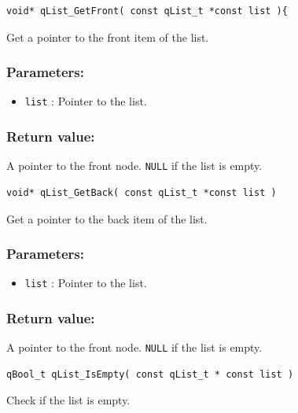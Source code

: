 \documentclass{article}
\begin{document}
\noindent\hrulefill

\begin{lstlisting}[style=CStyle]
void* qList_GetFront( const qList_t *const list ){
\end{lstlisting}

Get a pointer to the front item of the list. 

\subsubsection*{Parameters:}
\begin{itemize}
    \item \lstinline{list} : Pointer to the list. 
\end{itemize}

\subsubsection*{Return value:}
A pointer to the front node. \lstinline{NULL} if the list is empty.

\noindent\hrulefill

\begin{lstlisting}[style=CStyle]
void* qList_GetBack( const qList_t *const list )
\end{lstlisting}

Get a pointer to the back item of the list. 

\subsubsection*{Parameters:}
\begin{itemize}
    \item \lstinline{list} : Pointer to the list. 
\end{itemize}

\subsubsection*{Return value:}
A pointer to the front node. \lstinline{NULL} if the list is empty.


\noindent\hrulefill

\begin{lstlisting}[style=CStyle]
qBool_t qList_IsEmpty( const qList_t * const list )
\end{lstlisting}

Check if the list is empty. 
\end{document}
